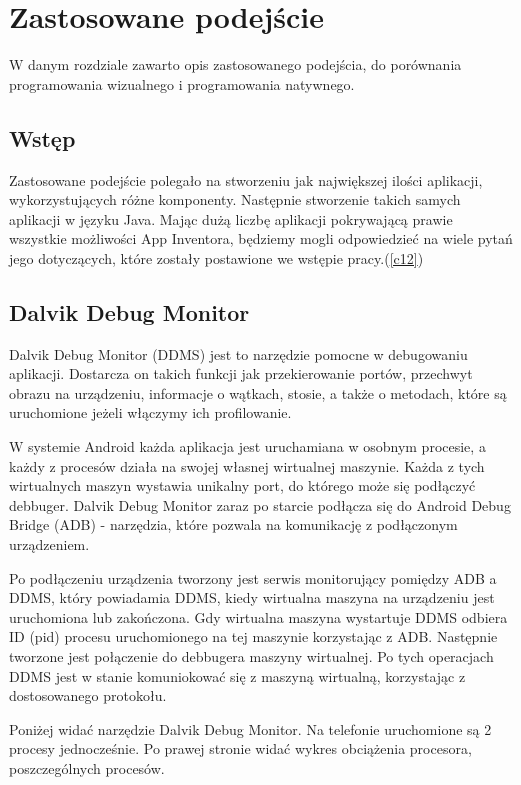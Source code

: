 \chapter{Zastosowane podejście}
\label{c4}

W danym rozdziale zawarto opis zastosowanego podejścia, do porównania programowania wizualnego i programowania natywnego.

\section{Wstęp}
\label{c41}

Zastosowane podejście polegało na stworzeniu jak największej ilości aplikacji, wykorzystujących różne komponenty. Następnie stworzenie takich samych aplikacji w języku Java. Mając dużą liczbę aplikacji pokrywającą prawie wszystkie możliwości App Inventora, będziemy mogli odpowiedzieć na wiele pytań jego dotyczących, które zostały postawione we wstępie pracy.(\ref{c12})

\section{Dalvik Debug Monitor}

Dalvik Debug Monitor (DDMS) jest to narzędzie pomocne w debugowaniu aplikacji. Dostarcza on takich funkcji jak przekierowanie portów, przechwyt obrazu na urządzeniu, informacje o wątkach, stosie, a także o metodach, które są uruchomione jeżeli włączymy ich profilowanie.

W systemie Android każda aplikacja jest uruchamiana w osobnym procesie, a każdy z procesów działa na swojej własnej wirtualnej maszynie. Każda z tych wirtualnych maszyn wystawia unikalny port, do którego może się podłączyć debbuger. Dalvik Debug Monitor zaraz po starcie podłącza się do Android Debug Bridge (ADB) - narzędzia, które pozwala na komunikację z podłączonym urządzeniem.

Po podłączeniu urządzenia tworzony jest serwis monitorujący pomiędzy ADB a DDMS, który powiadamia DDMS, kiedy wirtualna maszyna na urządzeniu jest uruchomiona lub zakończona. Gdy wirtualna maszyna wystartuje DDMS odbiera ID (pid) procesu uruchomionego na tej maszynie korzystając z ADB. Następnie tworzone jest połączenie do debbugera maszyny wirtualnej. Po tych operacjach DDMS jest w stanie komuniokować się z maszyną wirtualną, korzystając z dostosowanego protokołu.\cite{doc:ddms}

Poniżej widać narzędzie Dalvik Debug Monitor. Na telefonie uruchomione są 2 procesy jednocześnie. Po prawej stronie widać wykres obciążenia procesora, poszczególnych procesów.

